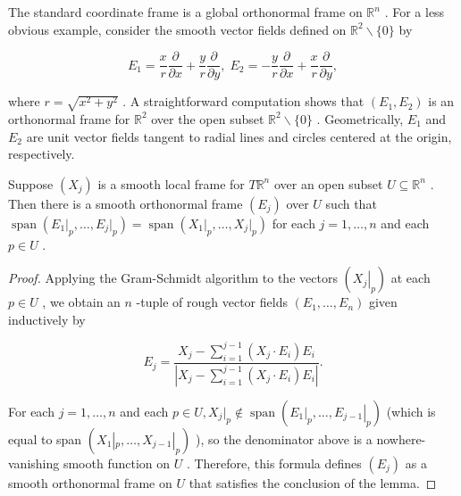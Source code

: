 \begin{example}
\label{ex:8-12}
\leanok
{}
The standard coordinate frame is a global orthonormal frame on ${\mathbb{R}}^{n}$ . For a less obvious example, consider the smooth vector fields defined on ${\mathbb{R}}^{2} \smallsetminus  \{ 0\}$ by

\[
{E}_{1} = \frac{x}{r}\frac{\partial }{\partial x} + \frac{y}{r}\frac{\partial }{\partial y},\;{E}_{2} =  - \frac{y}{r}\frac{\partial }{\partial x} + \frac{x}{r}\frac{\partial }{\partial y}, \tag{8.3}
\]

where $r = \sqrt{{x}^{2} + {y}^{2}}$ . A straightforward computation shows that $\left( {{E}_{1},{E}_{2}}\right)$ is an orthonormal frame for ${\mathbb{R}}^{2}$ over the open subset ${\mathbb{R}}^{2} \smallsetminus  \{ 0\}$ . Geometrically, ${E}_{1}$ and ${E}_{2}$ are unit vector fields tangent to radial lines and circles centered at the origin, respectively.
\end{example}

\begin{lemma}
\label{lem:8-13}
\leanok
{}
Suppose $\left( {X}_{j}\right)$ is a smooth local frame for $T{\mathbb{R}}^{n}$ over an open subset $U \subseteq  {\mathbb{R}}^{n}$ . Then there is a smooth orthonormal frame $\left( {E}_{j}\right)$ over $U$ such that $\operatorname{span}\left( {{E}_{1}{\left. \right| }_{p},\ldots ,{E}_{j}{\left. \right| }_{p}}\right)  = \operatorname{span}\left( {{X}_{1}{\left. \right| }_{p},\ldots ,{X}_{j}{\left. \right| }_{p}}\right)$ for each $j = 1,\ldots , n$ and each $p \in  U$ .
\end{lemma}

\begin{proof}
\leanok
Applying the Gram-Schmidt algorithm to the vectors $\left( {\left. {X}_{j}\right| }_{p}\right)$ at each $p \in  U$ , we obtain an $n$ -tuple of rough vector fields $\left( {{E}_{1},\ldots ,{E}_{n}}\right)$ given inductively by

\[
{E}_{j} = \frac{{X}_{j} - \mathop{\sum }\limits_{{i = 1}}^{{j - 1}}\left( {{X}_{j} \cdot  {E}_{i}}\right) {E}_{i}}{\left| {X}_{j} - \mathop{\sum }\limits_{{i = 1}}^{{j - 1}}\left( {X}_{j} \cdot  {E}_{i}\right) {E}_{i}\right| }.
\]

For each $j = 1,\ldots , n$ and each $p \in  U,{X}_{j}{\left. \right| }_{p} \notin  \operatorname{span}\left( {{\left. {E}_{1}\right| }_{p},\ldots ,{\left. {E}_{j - 1}\right| }_{p}}\right)$ (which is equal to span $\left( {{X}_{1}{\left| {}_{p},\ldots ,{X}_{j - 1}\right| }_{p}}\right)$ ), so the denominator above is a nowhere-vanishing smooth function on $U$ . Therefore, this formula defines $\left( {E}_{j}\right)$ as a smooth orthonormal frame on $U$ that satisfies the conclusion of the lemma.
\end{proof}

